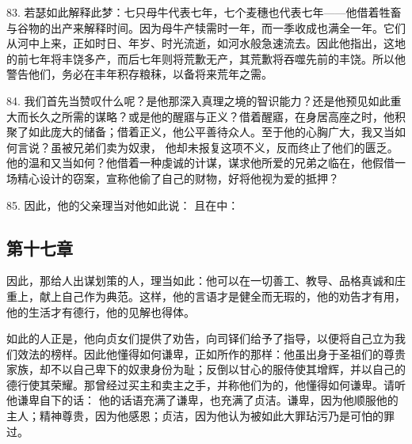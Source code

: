 83. 若瑟如此解释此梦：七只母牛代表七年，七个麦穗也代表七年——他借着牲畜与谷物的出产来解释时间。因为母牛产犊需时一年，而一季收成也满全一年。它们从河中上来，正如时日、年岁、时光流逝，如河水般急速流去。因此他指出，这地的前七年将丰饶多产，而后七年则将荒歉无产，其荒歉将吞噬先前的丰饶。所以他警告他们，务必在丰年积存粮秣，以备将来荒年之需。\par

84. 我们首先当赞叹什么呢？是他那深入真理之境的智识能力？还是他预见如此重大而长久之所需的谋略？或是他的醒寤与正义？借着醒寤，在身居高座之时，他积聚了如此庞大的储备；借着正义，他公平善待众人。至于他的心胸广大，我又当如何言说？虽被兄弟们卖为奴隶， 他却未报复这项不义，反而终止了他们的匮乏。他的温和又当如何？他借着一种虔诚的计谋，谋求他所爱的兄弟之临在，他假借一场精心设计的窃案，宣称他偷了自己的财物，好将他视为爱的抵押？\par

85. 因此，他的父亲理当对他如此说： 且在中： \par


\subsection{第十七章}

\par

因此，那给人出谋划策的人，理当如此：他可以在一切善工、教导、品格真诚和庄重上，献上自己作为典范。这样，他的言语才是健全而无瑕的，他的劝告才有用，他的生活才有德行，他的见解也得体。\par

如此的人正是，他向贞女们提供了劝告，向司铎们给予了指导，以便将自己立为我们效法的榜样。因此他懂得如何谦卑，正如所作的那样：他虽出身于圣祖们的尊贵家族，却不以自己卑下的奴隶身份为耻；反倒以甘心的服侍使其增辉，并以自己的德行使其荣耀。那曾经过买主和卖主之手，并称他们为的，他懂得如何谦卑。请听他谦卑自下的话： 他的话语充满了谦卑，也充满了贞洁。谦卑，因为他顺服他的主人；精神尊贵，因为他感恩；贞洁，因为他认为被如此大罪玷污乃是可怕的罪过。\par

